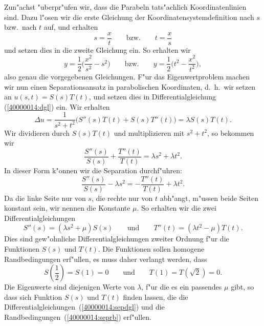 \begin{loesung}
Zun"achst "uberpr"ufen wir, dass die Parabeln tats"achlich Koordinatenlinien
sind.
Dazu l"osen wir die erste Gleichung der Koordinatensystemdefinition nach $s$
bzw.~nach $t$ auf, und erhalten
\[
s=\frac{x}{t}
\qquad\text{bzw.}\qquad
t=\frac{x}{s}
\]
und setzen dies in die zweite Gleichung ein. 
So erhalten wir
\[
y=\frac12\biggl(\frac{x^2}{s^2}-s^2\biggr)
\qquad\text{bzw.}\qquad
y=\frac12\biggl(t^2 - \frac{x^2}{t^2}\biggr),
\]
also genau die vorgegebenen Gleichungen.
F"ur das Eigenwertproblem machen wir nun einen Separationsansatz in 
parabolischen Koordinaten, d.~h.~wir setzen an $u(s,t)=S(s)T(t)$, und
setzen dies in Differentialgleichung (\ref{40000014:dgl}) ein.
Wir erhalten
\[
\Delta u
=
\frac1{s^2+t^2}\bigl(S''(s)T(t) + S(s)T''(t)\bigr) = \lambda S(s)T(t).
\]
Wir dividieren durch $S(s)T(t)$ und multiplizieren mit $s^2+t^2$, so
bekommen wir
\[
\frac{S''(s)}{S(s)} + \frac{T''(t)}{T(t)}=\lambda s^2 + \lambda t^2.
\]
In dieser Form k"onnen wir die Separation durchf"uhren:
\[
\frac{S''(s)}{S(s)} - \lambda s^2 = - \frac{T''(t)}{T(t)} + \lambda t^2.
\]
Da die linke Seite nur von $s$, die rechte nur von $t$ abh"angt, m"ussen
beide Seiten konstant sein, wir nennen die Konstante $\mu$.
So erhalten wir die zwei Differentialgleichungen
\begin{equation}
S''(s)=(\lambda s^2+\mu)S(s)
\qquad\text{und}\qquad
T''(t) = (\lambda t^2-\mu)T(t).
\label{40000014:sepdgl}
\end{equation}
Dies sind gew"ohnliche Differentialgleichungen zweiter Ordnung f"ur die
Funktionen $S(s)$ und $T(t)$.
Die Funktionen sollen homogene Randbedingungen erf"ullen, es muss daher
verlangt werden, dass
\begin{equation}
S({\textstyle \frac12})=S(1)=0
\qquad\text{und}\qquad
T(1)=T(\sqrt{2})=0.
\label{40000014:seprb}
\end{equation}
Die Eigenwerte sind diejenigen Werte von $\lambda$, f"ur die es ein passendes
$\mu$ gibt, so dass sich Funktion $S(s)$ und $T(t)$ finden lassen, die
die Differentialgleichungen~(\ref{40000014:sepdgl}) und die
Randbedingungen~(\ref{40000014:seprb}) erf"ullen.
\end{loesung}

